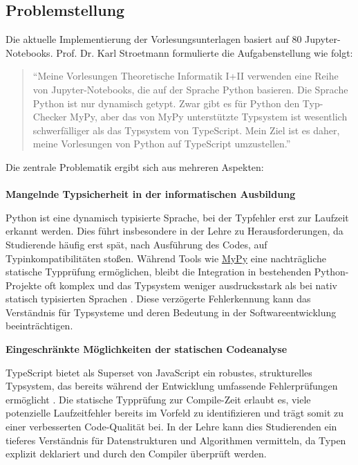 \subsection{Problemstellung}
Die aktuelle Implementierung der Vorlesungsunterlagen basiert auf 80 Jupyter-Notebooks. 
Prof. Dr. Karl Stroetmann formulierte die Aufgabenstellung wie folgt:
\begin{quote}
	\enquote{Meine Vorlesungen Theoretische Informatik I+II \cite{logic-repository} \cite{algorithms-repository} verwenden eine Reihe von Jupyter-Notebooks, die auf der Sprache Python basieren. Die Sprache Python ist nur dynamisch getypt. Zwar gibt es für Python den Typ-Checker MyPy, aber das von MyPy unterstützte Typsystem ist wesentlich schwerfälliger als das Typsystem von TypeScript. Mein Ziel ist es daher, meine Vorlesungen von Python auf TypeScript umzustellen.}
\end{quote}
Die zentrale Problematik ergibt sich aus mehreren Aspekten: \\ \\
\textbf{Mangelnde Typsicherheit in der informatischen Ausbildung}
\begin{description}[style=nextline, leftmargin=1cm, labelsep=1em]
	\item Python ist eine dynamisch typisierte Sprache, bei der Typfehler erst zur Laufzeit erkannt werden. Dies führt insbesondere in der Lehre zu Herausforderungen, da Studierende häufig erst spät, nach Ausführung des Codes, auf Typinkompatibilitäten stoßen. Während Tools wie \href{https://mypy-lang.org}{MyPy} eine nachträgliche statische Typprüfung ermöglichen, bleibt die Integration in bestehenden Python-Projekte oft komplex und das Typsystem weniger ausdrucksstark als bei nativ statisch typisierten Sprachen \cite{understanding-typescript}. Diese verzögerte Fehlerkennung kann das Verständnis für Typsysteme und deren Bedeutung in der Softwareentwicklung beeinträchtigen.
\end{description}
\textbf{Eingeschränkte Möglichkeiten der statischen Codeanalyse}
\begin{description}[style=nextline, leftmargin=1cm, labelsep=1em]
	\item TypeScript bietet als Superset von JavaScript ein robustes, strukturelles Typsystem, das bereits während der Entwicklung umfassende Fehlerprüfungen ermöglicht \cite{understanding-typescript}. Die statische Typprüfung zur Compile-Zeit erlaubt es, viele potenzielle Laufzeitfehler bereits im Vorfeld zu identifizieren und trägt somit zu einer verbesserten Code-Qualität bei. In der Lehre kann dies Studierenden ein tieferes Verständnis für Datenstrukturen und Algorithmen vermitteln, da Typen explizit deklariert und durch den Compiler überprüft werden.
\end{description}
